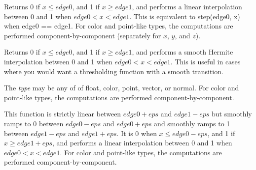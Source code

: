\documentclass[11pt,letterpaper]{book}
\def\color{{\cf color}\xspace}
\def\float{{\cf float}\xspace}
\def\normal{{\cf normal}\xspace}
\def\point{{\cf point}\xspace}
\def\vector{{\cf vector}\xspace}
\begin{document}
Returns 0 if $x \le {\mathit edge0}$, and 1 if $x \ge {\mathit edge1}$,
and performs a linear
interpolation between 0 and 1 when ${\mathit edge0} < x < {\mathit edge1}$.
This is equivalent to {\cf step(edge0, x)} when {\cf edge0 == edge1}.
For \color and \point-like types, the computations are
performed component-by-component (separately for $x$, $y$, and $z$).
\apiend

Returns 0 if $x \le {\mathit edge0}$, and 1 if $x \ge {\mathit edge1}$,
and performs a smooth Hermite
interpolation between 0 and 1 when ${\mathit edge0} < x < {\mathit edge1}$.
This is useful in cases where you would want a thresholding function
with a smooth transition.

The \emph{type} may be any of of \float, \color, \point, \vector, or
\normal.  For \color and \point-like types, the computations are
performed component-by-component.
\apiend

This function is strictly linear between ${\mathit edge0}+{\mathit eps}$ and ${\mathit edge1}-{\mathit eps}$
but smoothly ramps to 0 between ${\mathit edge0}-{\mathit eps}$ and ${\mathit edge0}+{\mathit eps}$
and smoothly ramps to 1 between ${\mathit edge1}-{\mathit eps}$ and ${\mathit edge1}+{\mathit eps}$.
It is 0 when $x \le {\mathit edge0}-{\mathit eps}$, and 1 if $x \ge {\mathit edge1}+{\mathit eps}$,
and performs a linear
interpolation between 0 and 1 when ${\mathit edge0} < x < {\mathit edge1}$.
For \color and \point-like types, the computations are
performed component-by-component.
\apiend


%
\end{document}
